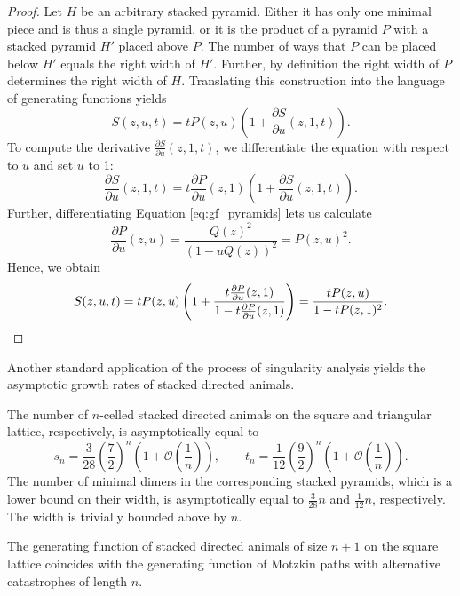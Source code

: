 \begin{proof}
  Let $H$ be an arbitrary stacked pyramid. Either it has only one minimal piece and is thus a single pyramid, or it is the product of a pyramid $P$ with a stacked pyramid $H'$ placed above $P$. The number of ways that $P$ can be placed below $H'$ equals the right width of $H'$. Further, by definition the right width of $P$ determines the right width of $H$. Translating this construction into the language of generating functions yields
  $$
    S(z,u,t) = tP(z,u)\left(1 + \frac{\partial S}{\partial u}(z,1,t)\right).
  $$
  To compute the derivative $\frac{\partial S}{\partial u}(z,1,t)$, we differentiate the equation with respect to $u$ and set $u$ to 1:
  $$
  \frac{\partial S}{\partial u}(z,1,t) = t\frac{\partial P}{\partial u}(z,1)\left(1 + \frac{\partial S}{\partial u}(z,1,t)\right).
  $$
  Further, differentiating Equation \eqref{eq:gf_pyramids} lets us calculate
  $$
  \frac{\partial P}{\partial u}(z,u) = \frac{Q(z)^2}{(1 - uQ(z))^2} = P(z,u)^2.
  $$
  Hence, we obtain
  \begin{equation*}
    S(z,u,t) = tP(z,u)\left(1 + \frac{t\frac{\partial P}{\partial u}(z,1)}{1 -  t\frac{\partial P}{\partial u}(z,1)}\right)
    = \frac{tP(z,u)}{1 -  tP(z,1)^2}. \qedhere
  \end{equation*}
\end{proof}

Another standard application of the process of singularity analysis yields the asymptotic growth rates of stacked directed animals.

\begin{corollary}
  The number of $n$-celled stacked directed animals on the square and triangular lattice, respectively, is asymptotically equal to
  \begin{equation*}
    s_n = \frac{3}{28} \left(\frac{7}{2}\right)^n\left(1 + \mathcal{O}\left(\frac{1}{n}\right)\right), \qquad
    t_n = \frac{1}{12} \left(\frac{9}{2}\right)^n\left(1 + \mathcal{O}\left(\frac{1}{n}\right)\right).
  \end{equation*}
  The number of minimal dimers in the corresponding stacked pyramids, which is a lower bound on their width, is asymptotically equal to $\frac{3}{28}n$ and $\frac{1}{12}n$, respectively. The width is trivially bounded above by $n$.
\end{corollary}

\begin{theorem}
  The generating function of stacked directed animals of size $n+1$ on the square lattice coincides with the generating function of Motzkin paths with alternative catastrophes of length $n$.
\end{theorem}

